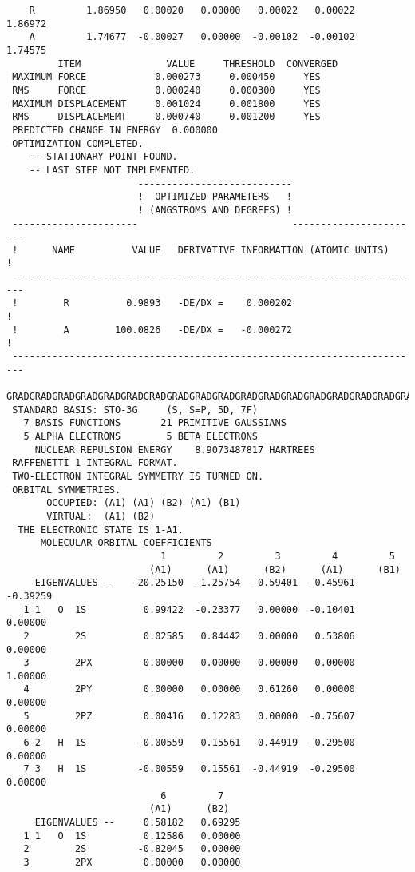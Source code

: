 {\begin{verbatim}
    R         1.86950   0.00020   0.00000   0.00022   0.00022   1.86972
    A         1.74677  -0.00027   0.00000  -0.00102  -0.00102   1.74575
         ITEM               VALUE     THRESHOLD  CONVERGED
 MAXIMUM FORCE            0.000273     0.000450     YES
 RMS     FORCE            0.000240     0.000300     YES
 MAXIMUM DISPLACEMENT     0.001024     0.001800     YES
 RMS     DISPLACEMEMT     0.000740     0.001200     YES
 PREDICTED CHANGE IN ENERGY  0.000000
 OPTIMIZATION COMPLETED.
    -- STATIONARY POINT FOUND.
    -- LAST STEP NOT IMPLEMENTED.
                       ---------------------------
                       !  OPTIMIZED PARAMETERS   !
                       ! (ANGSTROMS AND DEGREES) !
 ----------------------                           -----------------------
 !      NAME          VALUE   DERIVATIVE INFORMATION (ATOMIC UNITS)     !
 ------------------------------------------------------------------------
 !        R          0.9893   -DE/DX =    0.000202                      !
 !        A        100.0826   -DE/DX =   -0.000272                      !
 ------------------------------------------------------------------------
 GRADGRADGRADGRADGRADGRADGRADGRADGRADGRADGRADGRADGRADGRADGRADGRADGRADGRAD
 STANDARD BASIS: STO-3G     (S, S=P, 5D, 7F)
   7 BASIS FUNCTIONS       21 PRIMITIVE GAUSSIANS
   5 ALPHA ELECTRONS        5 BETA ELECTRONS
     NUCLEAR REPULSION ENERGY    8.9073487817 HARTREES
 RAFFENETTI 1 INTEGRAL FORMAT.
 TWO-ELECTRON INTEGRAL SYMMETRY IS TURNED ON.
 ORBITAL SYMMETRIES.
       OCCUPIED: (A1) (A1) (B2) (A1) (B1)
       VIRTUAL:  (A1) (B2)
  THE ELECTRONIC STATE IS 1-A1.
      MOLECULAR ORBITAL COEFFICIENTS
                           1         2         3         4         5
                         (A1)      (A1)      (B2)      (A1)      (B1)
     EIGENVALUES --   -20.25150  -1.25754  -0.59401  -0.45961  -0.39259
   1 1   O  1S          0.99422  -0.23377   0.00000  -0.10401   0.00000
   2        2S          0.02585   0.84442   0.00000   0.53806   0.00000
   3        2PX         0.00000   0.00000   0.00000   0.00000   1.00000
   4        2PY         0.00000   0.00000   0.61260   0.00000   0.00000
   5        2PZ         0.00416   0.12283   0.00000  -0.75607   0.00000
   6 2   H  1S         -0.00559   0.15561   0.44919  -0.29500   0.00000
   7 3   H  1S         -0.00559   0.15561  -0.44919  -0.29500   0.00000
                           6         7
                         (A1)      (B2)
     EIGENVALUES --     0.58182   0.69295
   1 1   O  1S          0.12586   0.00000
   2        2S         -0.82045   0.00000
   3        2PX         0.00000   0.00000

\end{verbatim}}
